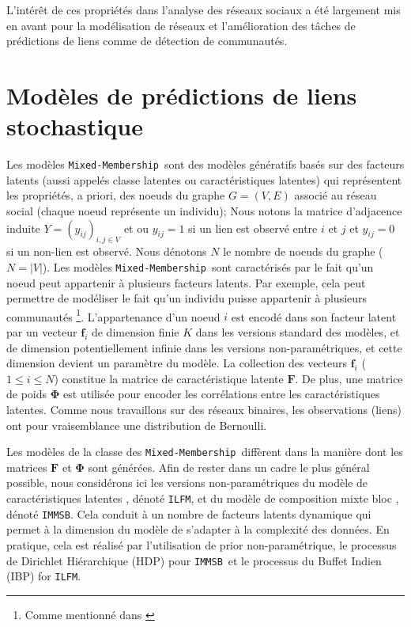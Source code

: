 \documentclass[french]{hermes-journal}
\newcommand{\ilfm}{\texttt{ILFM}}
\newcommand{\immsb}{\texttt{IMMSB}}
\newcommand{\mmm}{\texttt{Mixed-Membership}~}
\newcommand{\mat}[1]{\bm{#1}}
\begin{document}
L'intérêt de ces propriétés dans l'analyse des réseaux sociaux a été largement mis en avant pour la modélisation de réseaux et l'amélioration des tâches de prédictions de liens comme de détection de communautés.


\section{Modèles de prédictions de liens stochastique}

Les modèles \mmm sont des modèles génératifs basés sur des facteurs latents (aussi appelés classe latentes ou caractéristiques latentes) qui représentent les propriétés, a priori, des noeuds du graphe $G=(V,E)$ associé au réseau social (chaque noeud représente un individu); Nous notons la matrice d'adjacence induite $Y=(y_{ij})_{i,j\in V}$ et ou $y_{ij}=1$ si un lien est observé entre $i$ et $j$ et $y_{ij}=0$ si un non-lien est observé. Nous dénotons $N$ le nombre de noeuds du graphe ($N=|V|$). Les modèles \mmm sont caractérisés par le fait qu'un noeud peut appartenir à plusieurs facteurs latents. Par exemple, cela peut permettre de modéliser le fait qu'un individu puisse appartenir à plusieurs communautés \footnote{Comme mentionné dans \cite{goldenberg2010survey} }. L'appartenance d'un noeud $i$ est encodé dans son facteur latent par un vecteur $\mat{f}_i$ de dimension finie $K$ dans les versions standard des modèles, et de dimension potentiellement infinie dans les versions non-paramétriques, et cette dimension devient un paramètre du modèle. La collection des vecteurs $\mat{f}_{i}$ ($1 \le i \le N$) constitue la matrice de caractéristique latente $\mat{F}$. De plus, une matrice de poids $\mat{\Phi}$ est utilisée pour encoder les corrélations entre les caractéristiques latentes. Comme nous travaillons sur des réseaux binaires, les observations (liens) ont pour vraisemblance une distribution de Bernoulli.

Les modèles de la classe des \mmm diffèrent dans la manière dont les matrices $\mat{F}$ et $\mat{\Phi}$ sont générées. Afin de rester dans un cadre le plus général possible, nous considérons ici les versions non-paramétriques du modèle de caractéristiques latentes \cite{ILFRM}, dénoté \ilfm, et du modèle de composition mixte bloc  \cite{iMMSB,fan2015dynamic}, dénoté \immsb. Cela conduit à un nombre de facteurs latents dynamique qui permet à la dimension du modèle de s'adapter à la complexité des données. En pratique, cela est réalisé par l'utilisation de prior non-paramétrique, le processus de Dirichlet Hiérarchique (HDP) pour \immsb\ et le processus du Buffet Indien (IBP) for \ilfm.~\\
\end{document}
